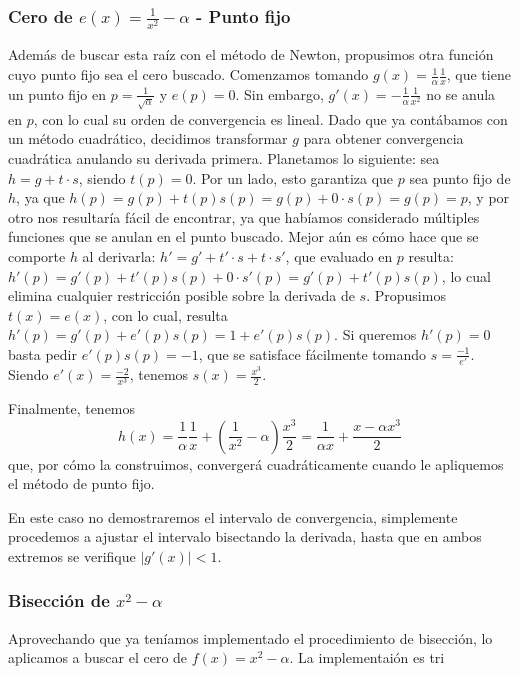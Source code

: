 \subsubsection{Cero de $e(x) = \frac{1}{x^2} - \alpha$ - Punto fijo}
Además de buscar esta raíz con el método de Newton, propusimos otra función cuyo punto fijo sea el cero buscado. Comenzamos tomando $g(x) = \frac{1}{\alpha} \frac{1}{x}$, que tiene un punto fijo en  $p = \frac{1}{\sqrt{\alpha}}$ y $e(p)= 0$. Sin embargo, $g'(x) = -\frac{1}{\alpha} \frac{1}{x^2}$ no se anula en $p$, con lo cual su orden de convergencia es lineal. Dado que ya contábamos con un método cuadrático, decidimos transformar $g$ para obtener convergencia cuadrática anulando su derivada primera. Planetamos lo siguiente: sea $h = g + t \cdot s$, siendo $t(p) = 0$. Por un lado, esto garantiza que $p$ sea punto fijo de $h$, ya que $h(p) = g(p) + t(p)s(p) = g(p) + 0\cdot s(p) = g(p) = p$, y por otro nos resultaría fácil de encontrar, ya que habíamos considerado múltiples funciones que se anulan en el punto buscado. Mejor aún es cómo hace que se comporte $h$ al derivarla: $h' = g' + t'\cdot s + t \cdot s'$, que evaluado en $p$ resulta: $h'(p) = g'(p) + t'(p)s(p) + 0\cdot s'(p) = g'(p) + t'(p)s(p)$, lo cual elimina cualquier restricción posible sobre la derivada de $s$. Propusimos $t(x) = e(x)$, con lo cual, resulta $h'(p) = g'(p) + e'(p)s(p) = 1 + e'(p)s(p)$. Si queremos $h'(p) = 0$ basta pedir $e'(p)s(p) = -1$, que se satisface fácilmente tomando $s = \frac{-1}{e'}$. Siendo $e'(x) = \frac{-2}{x^3}$, tenemos $s(x) = \frac{x^3}{2}$.

Finalmente, tenemos 
\begin{equation}
	h(x) = \frac{1}{\alpha} \frac{1}{x} + (\frac{1}{x^2} - \alpha)\frac{x^3}{2} =  \frac{1}{\alpha x} + \frac{x - \alpha x^3}{2}
\end{equation}
que, por cómo la construimos, convergerá cuadráticamente cuando le apliquemos el método de punto fijo.

En este caso no demostraremos el intervalo de convergencia, simplemente procedemos a ajustar el intervalo bisectando la derivada, hasta que en ambos extremos se verifique $|g'(x)| < 1$.

\subsubsection{Bisección de $x^2-\alpha$}
Aprovechando que ya teníamos implementado el procedimiento de bisección, lo aplicamos a buscar el cero de $f(x) = x^2-\alpha$. La implementaión es tri



